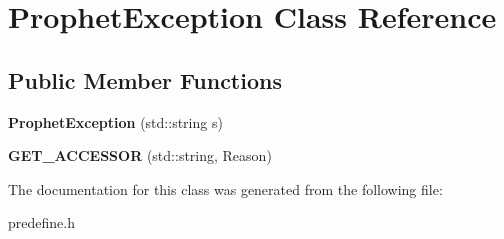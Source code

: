 \hypertarget{classProphetException}{
\section{ProphetException Class Reference}
\label{classProphetException}
}
\subsection*{Public Member Functions}
\begin{DoxyCompactItemize}
\item 
\hypertarget{classProphetException_a4305dd7b73d550cfd74575e4bb876aca}{
{\bfseries ProphetException} (std::string s)}
\label{classProphetException_a4305dd7b73d550cfd74575e4bb876aca}

\item 
\hypertarget{classProphetException_a6278d95871d281e0486815fa7dca882c}{
{\bfseries GET\_\-ACCESSOR} (std::string, Reason)}
\label{classProphetException_a6278d95871d281e0486815fa7dca882c}

\end{DoxyCompactItemize}


The documentation for this class was generated from the following file:\begin{DoxyCompactItemize}
\item 
predefine.h\end{DoxyCompactItemize}
